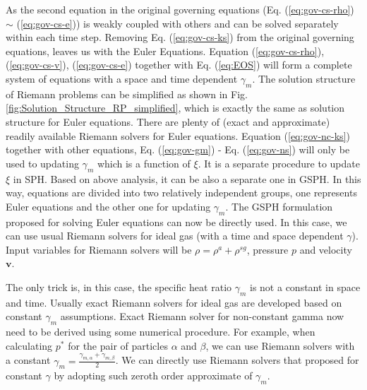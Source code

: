 As the second equation in the original governing equations (Eq. (\ref{eq:gov-cs-rho}) $\sim$ (\ref{eq:gov-cs-e})) is weakly coupled with others and can be solved separately within each time step. Removing Eq. (\ref{eq:gov-cs-ks}) from the original governing equations, leaves us with the Euler Equations. Equation (\ref{eq:gov-cs-rho}), (\ref{eq:gov-cs-v}), (\ref{eq:gov-cs-e}) together with Eq. (\ref{eq:EOS}) will form a complete system of equations with a space and time dependent $\gamma_{m}$. The solution structure of Riemann problems can be simplified as shown in Fig. \ref{fig:Solution_Structure_RP_simplified}, which is exactly the same as solution structure for Euler equations. There are plenty of (exact and approximate) readily available Riemann solvers for Euler equations. Equation (\ref{eq:gov-nc-ks}) together with other equations, Eq. (\ref{eq:gov-gm}) - Eq. (\ref{eq:gov-ns}) will only be used to updating $\gamma_{m}$ which is a function of $\xi$. It is a separate procedure to update $\xi$ in SPH. Based on above analysis, it can be also a separate one in GSPH. In this way, equations are divided into two relatively independent groups, one represents Euler equations and the other one for updating $\gamma_{m}$.
The GSPH formulation \citep{inutsuka2002reformulation} proposed for solving Euler equations can now be directly used. In this case, we can use usual Riemann solvers for ideal gas (with a time and space dependent $\gamma$). Input variables for Riemann solvers will be $\rho=\rho^a + \rho^{sg}$, pressure $p$ and velocity $\textbf{v}$.
 
The only trick is, in this case, the specific heat ratio $\gamma_{m}$ is not a constant in space and time. Usually exact Riemann solvers for ideal gas are developed based on constant $\gamma_{m}$ assumptions. Exact Riemann solver for non-constant gamma now need to be derived using some numerical procedure. For example, when calculating $p^{\ast}$ for the pair of  particles $\alpha$ and $\beta$, we can use Riemann solvers with a constant $\gamma_{m}=\frac{\gamma_{m,\alpha}+\gamma_{m,\beta}}{2}$. We can directly use Riemann solvers that proposed for constant $\gamma$ by adopting such zeroth order approximate of $\gamma_m$.